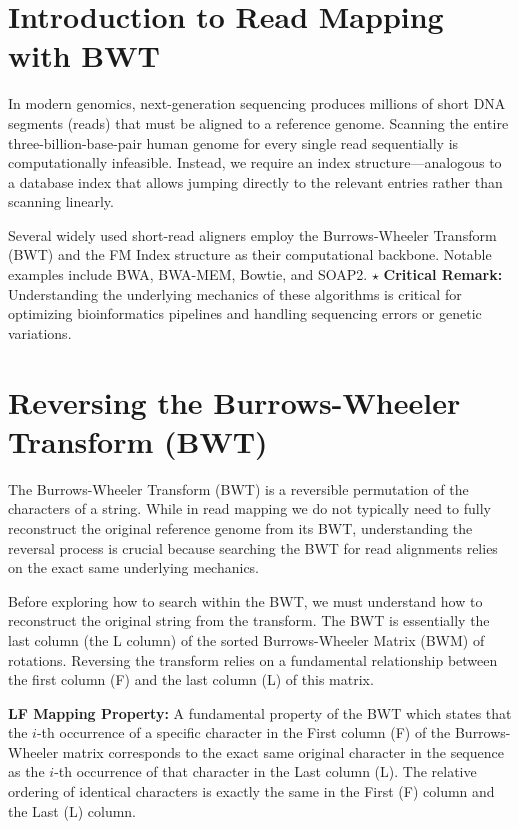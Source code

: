 \def\sta{$\star$ \textbf{Critical Remark:} }


\section{Introduction to Read Mapping with BWT}

In modern genomics, next-generation sequencing produces millions of short DNA segments (reads) that must be aligned to a reference genome. Scanning the entire three-billion-base-pair human genome for every single read sequentially is computationally infeasible. Instead, we require an index structure—analogous to a database index that allows jumping directly to the relevant entries rather than scanning linearly. 

Several widely used short-read aligners employ the Burrows-Wheeler Transform (BWT) and the FM Index structure as their computational backbone. Notable examples include BWA, BWA-MEM, Bowtie, and SOAP2. \sta Understanding the underlying mechanics of these algorithms is critical for optimizing bioinformatics pipelines and handling sequencing errors or genetic variations.

\section{Reversing the Burrows-Wheeler Transform (BWT)}

The Burrows-Wheeler Transform (BWT) is a reversible permutation of the characters of a string. While in read mapping we do not typically need to fully reconstruct the original reference genome from its BWT, understanding the reversal process is crucial because searching the BWT for read alignments relies on the exact same underlying mechanics.

Before exploring how to search within the BWT, we must understand how to reconstruct the original string from the transform. The BWT is essentially the last column (the L column) of the sorted Burrows-Wheeler Matrix (BWM) of rotations. Reversing the transform relies on a fundamental relationship between the first column (F) and the last column (L) of this matrix.

\begin{important}
    \textbf{LF Mapping Property:} A fundamental property of the BWT which states that the $i$-th occurrence of a specific character in the First column (F) of the Burrows-Wheeler matrix corresponds to the exact same original character in the sequence as the $i$-th occurrence of that character in the Last column (L). The relative ordering of identical characters is exactly the same in the First (F) column and the Last (L) column.
\end{important}


